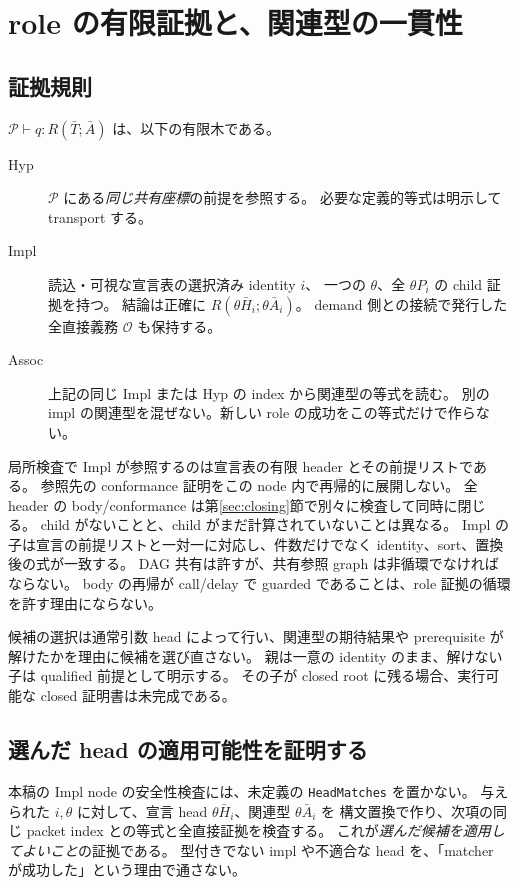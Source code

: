 \documentclass[11pt,a4paper]{article}
\begin{document}
\section{role の有限証拠と、関連型の一貫性}
\label{sec:role}

\subsection{証拠規則}

\(\mathcal P\vdash q:R(\bar T;\bar A)\) は、以下の有限木である。
\begin{description}
\item[Hyp] \(\mathcal P\) にある\emph{同じ共有座標}の前提を参照する。
      必要な定義的等式は明示して transport する。
\item[Impl] 読込・可視な宣言表の選択済み identity \(i\)、
      一つの \(\theta\)、全 \(\theta P_i\) の child 証拠を持つ。
      結論は正確に \(R(\theta\bar H_i;\theta\bar A_i)\)。
      demand 側との接続で発行した全直接義務 \(\mathcal O\) も保持する。
\item[Assoc] 上記の同じ Impl または Hyp の index から関連型の等式を読む。
      別の impl の関連型を混ぜない。新しい role の成功をこの等式だけで作らない。
\end{description}
局所検査で Impl が参照するのは宣言表の有限 header とその前提リストである。
参照先の conformance 証明をこの node 内で再帰的に展開しない。
全 header の body/conformance は第\ref{sec:closing}節で別々に検査して同時に閉じる。
child がないことと、child がまだ計算されていないことは異なる。
Impl の子は宣言の前提リストと一対一に対応し、件数だけでなく identity、sort、置換後の式が一致する。
DAG 共有は許すが、共有参照 graph は非循環でなければならない。
body の再帰が call/delay で guarded であることは、role 証拠の循環を許す理由にならない。

候補の選択は通常引数 head によって行い、関連型の期待結果や
prerequisite が解けたかを理由に候補を選び直さない。
親は一意の identity のまま、解けない子は qualified 前提として明示する。
その子が closed root に残る場合、実行可能な closed 証明書は未完成である。

\subsection{選んだ head の適用可能性を証明する}

本稿の Impl node の安全性検査には、未定義の \texttt{HeadMatches} を置かない。
与えられた \(i,\theta\) に対して、宣言 head \(\theta\bar H_i\)、関連型 \(\theta\bar A_i\) を
構文置換で作り、次項の同じ packet index との等式と全直接証拠を検査する。
これが\emph{選んだ候補を適用してよいこと}の証拠である。
型付きでない impl や不適合な head を、「matcher が成功した」という理由で通さない。
\end{document}
